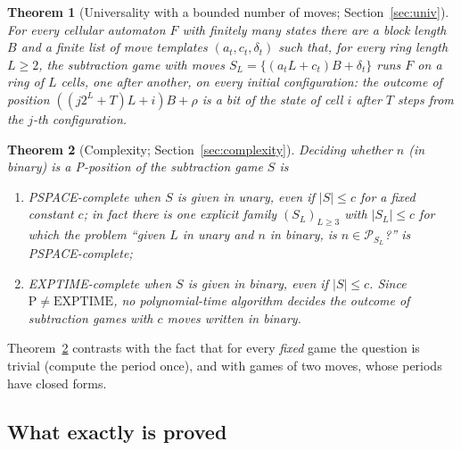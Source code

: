\documentclass[11pt]{article}
\newtheorem{theorem}{Theorem}
\theoremstyle{definition}
\newcommand{\cP}{\mathcal{P}}
\begin{document}
\begin{theorem}[Universality with a bounded number of moves; Section~\ref{sec:univ}]\label{thm:univintro}
For every cellular automaton $F$ with finitely many states there are a block length $B$ and a
finite list of move templates $(a_t,c_t,\delta_t)$ such that, for every ring length $L\ge2$, the
subtraction game with moves $S_L=\{(a_tL+c_t)B+\delta_t\}$ runs $F$ on a ring of $L$ cells, one after
another, on \emph{every} initial configuration: the outcome of position $((j2^L+T)L+i)B+\rho$ is a
bit of the state of cell $i$ after $T$ steps from the $j$-th configuration.
\end{theorem}

\begin{theorem}[Complexity; Section~\ref{sec:complexity}]\label{thm:complexintro}
Deciding whether $n$ (in binary) is a P-position of the subtraction game $S$ is
\begin{enumerate}[label=(\alph*)]
\item PSPACE-complete when $S$ is given in unary, even if $|S|\le c$ for a fixed constant $c$; in
fact there is one explicit family $(S_L)_{L\ge3}$ with $|S_L|\le c$ for which the problem
``given $L$ in unary and $n$ in binary, is $n\in\cP_{S_L}$?'' is PSPACE-complete;
\item EXPTIME-complete when $S$ is given in binary, even if $|S|\le c$.  Since
$\mathrm{P}\ne\mathrm{EXPTIME}$, no polynomial-time algorithm decides the outcome of subtraction
games with $c$ moves written in binary.
\end{enumerate}
\end{theorem}

Theorem~\ref{thm:complexintro} contrasts with the fact that for every \emph{fixed} game the question
is trivial (compute the period once), and with games of two moves, whose periods have closed forms.

\subsection{What exactly is proved}\label{sec:scope}
\end{document}
